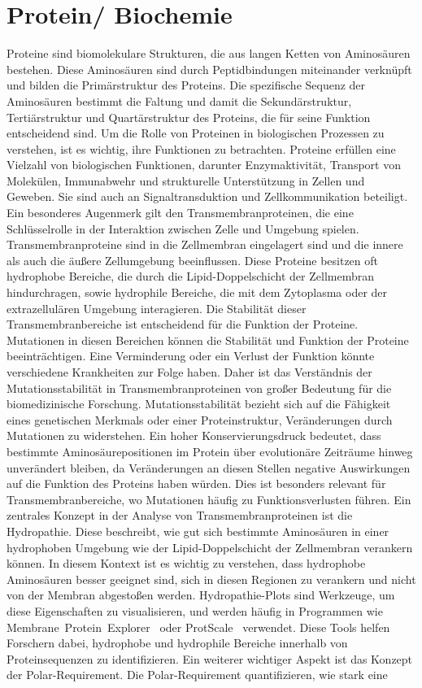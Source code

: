 \documentclass[german,version-2022-01]{uzl-thesis}
\begin{document}
\section{Protein/ Biochemie}
Proteine sind biomolekulare Strukturen, die aus langen Ketten von Aminos\"auren bestehen. Diese Aminos\"auren sind durch Peptidbindungen miteinander verkn\"upft und bilden die Prim\"arstruktur des Proteins. Die spezifische Sequenz der Aminos\"auren bestimmt die Faltung und damit die Sekund\"arstruktur, Terti\"arstruktur und Quart\"arstruktur des Proteins, die f\"ur seine Funktion entscheidend sind. Um die Rolle von Proteinen in biologischen Prozessen zu verstehen, ist es wichtig, ihre Funktionen zu betrachten. Proteine erf\"ullen eine Vielzahl von biologischen Funktionen, darunter Enzymaktivit\"at, Transport von Molek\"ulen, Immunabwehr und strukturelle Unterst\"utzung in Zellen und Geweben. Sie sind auch an Signaltransduktion und Zellkommunikation beteiligt. Ein besonderes Augenmerk gilt den Transmembranproteinen, die eine Schl\"usselrolle in der Interaktion zwischen Zelle und Umgebung spielen. Transmembranproteine sind in die Zellmembran eingelagert sind und die innere als auch die \"au\ss{}ere Zellumgebung beeinflussen. Diese Proteine besitzen oft hydrophobe Bereiche, die durch die Lipid-Doppelschicht der Zellmembran hindurchragen, sowie hydrophile Bereiche, die mit dem Zytoplasma oder der extrazellul\"aren Umgebung interagieren. Die Stabilit\"at dieser Transmembranbereiche ist entscheidend f\"ur die Funktion der Proteine. Mutationen in diesen Bereichen k\"onnen die Stabilit\"at und Funktion der Proteine beeintr\"achtigen. Eine Verminderung oder ein Verlust der Funktion k\"onnte verschiedene Krankheiten zur Folge haben. Daher ist das Verst\"andnis der Mutationsstabilit\"at in Transmembranproteinen von gro\ss{}er Bedeutung f\"ur die biomedizinische Forschung. Mutationsstabilit\"at bezieht sich auf die F\"ahigkeit eines genetischen Merkmals oder einer Proteinstruktur, Ver\"anderungen durch Mutationen zu widerstehen. Ein hoher Konservierungsdruck bedeutet, dass bestimmte Aminos\"aurepositionen im Protein \"uber evolution\"are Zeitr\"aume hinweg unver\"andert bleiben, da Ver\"anderungen an diesen Stellen negative Auswirkungen auf die Funktion des Proteins haben w\"urden. Dies ist besonders relevant f\"ur Transmembranbereiche, wo Mutationen h\"aufig zu Funktionsverlusten f\"uhren. Ein zentrales Konzept in der Analyse von Transmembranproteinen ist die Hydropathie. Diese beschreibt, wie gut sich bestimmte Aminos\"auren in einer hydrophoben Umgebung wie der Lipid-Doppelschicht der Zellmembran verankern k\"onnen. In diesem Kontext ist es wichtig zu verstehen, dass hydrophobe Aminos\"auren besser geeignet sind, sich in diesen Regionen zu verankern und nicht von der Membran abgesto\ss{}en werden. Hydropathie-Plots sind Werkzeuge, um diese Eigenschaften zu visualisieren, und werden h\"aufig in Programmen wie Membrane~Protein~Explorer~\cite{membraneProteinExplorer} oder ProtScale~\cite{protScale} verwendet. Diese Tools helfen Forschern dabei, hydrophobe und hydrophile Bereiche innerhalb von Proteinsequenzen zu identifizieren. Ein weiterer wichtiger Aspekt ist das Konzept der Polar-Requirement. Die Polar-Requirement quantifizieren, wie stark eine 
\end{document}
